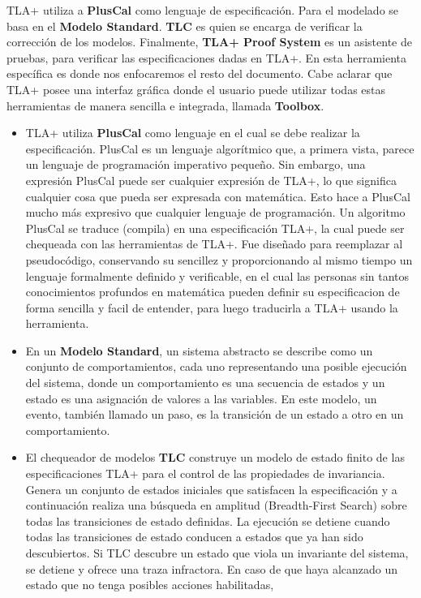 \documentclass[spanish]{llncs}
\begin{document}
TLA+ utiliza a \textbf{PlusCal} como lenguaje de especificación.
Para el modelado se basa en el \textbf{Modelo Standard}.
\textbf{TLC} es quien se encarga de verificar la corrección de los modelos.
Finalmente, \textbf{TLA+ Proof System} es un asistente de pruebas, para verificar las especificaciones dadas en TLA+. 
En esta herramienta específica es donde nos enfocaremos el resto del documento. 
Cabe aclarar que TLA+ posee una interfaz gráfica donde el usuario puede utilizar todas estas herramientas de manera sencilla e integrada, llamada \textbf{Toolbox}.
  
  \begin{itemize}
    \item TLA+ utiliza \textbf{PlusCal} como lenguaje en el cual se debe realizar la especificación.
	  PlusCal es un lenguaje algorítmico que, a primera vista, parece un lenguaje de programación imperativo pequeño. Sin embargo, una expresión PlusCal puede ser cualquier expresión de TLA+, lo que significa cualquier cosa que pueda ser expresada con matemática. Esto hace a PlusCal mucho más expresivo que cualquier lenguaje de programación.
	  Un algoritmo PlusCal se traduce (compila) en una especificación TLA+, la cual puede ser chequeada con las herramientas de TLA+.
	  Fue diseñado para  reemplazar al  pseudocódigo, conservando su sencillez y proporcionando al mismo tiempo un lenguaje formalmente definido y verificable, en el cual las personas sin tantos conocimientos profundos en matemática pueden definir su especificacion de forma sencilla y facil de entender,
	  para luego traducirla a TLA+ usando la herramienta.
    \item En un \textbf{Modelo Standard}, un sistema abstracto se describe como un conjunto de comportamientos, cada uno representando una posible ejecución del sistema, donde un comportamiento es una secuencia de estados y un estado es una asignación de valores a las variables.
	  En este modelo, un evento, también llamado un paso, es la transición de un estado a otro en un comportamiento.
    \item El chequeador de modelos \textbf{TLC} construye un modelo de estado finito de las especificaciones TLA+ para el control de las propiedades de invariancia.
	  Genera un conjunto de estados iniciales que satisfacen la especificación y a continuación realiza una búsqueda en amplitud (Breadth-First Search) sobre todas las transiciones de estado definidas. 
	  La ejecución se detiene cuando todas las transiciones de estado conducen a estados que ya han sido descubiertos. Si TLC descubre un estado que viola un invariante del sistema, se detiene y ofrece una traza infractora. En caso de que haya alcanzado un estado que no tenga posibles acciones habilitadas, 

\end{itemize}
\end{document}
